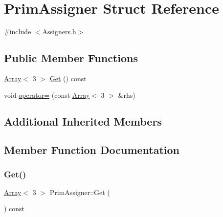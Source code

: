\hypertarget{structPrimAssigner}{}\section{Prim\+Assigner Struct Reference}
\label{structPrimAssigner}


{\ttfamily \#include $<$Assigners.\+h$>$}

\subsection*{Public Member Functions}
\begin{DoxyCompactItemize}
\item 
\hyperlink{Includes_8h_abd9de33944f934950000c3929e14ad8d}{Array}$<$ 3 $>$ \hyperlink{structPrimAssigner_ad883c9bec1fb17226f7f9c6c87146622}{Get} () const
\item 
void \hyperlink{structPrimAssigner_ab601615dec819d9e8756d77fb7d76ab3}{operator=} (const \hyperlink{Includes_8h_abd9de33944f934950000c3929e14ad8d}{Array}$<$ 3 $>$ \&rhs)
\end{DoxyCompactItemize}
\subsection*{Additional Inherited Members}


\subsection{Member Function Documentation}
\mbox{\label{structPrimAssigner_ad883c9bec1fb17226f7f9c6c87146622}} 
\subsubsection{\texorpdfstring{Get()}{Get()}}
{\footnotesize\ttfamily \hyperlink{Includes_8h_abd9de33944f934950000c3929e14ad8d}{Array}$<$ 3 $>$ Prim\+Assigner\+::\+Get (\begin{DoxyParamCaption}{ }\end{DoxyParamCaption}) const}

\mbox{\label{structPrimAssigner_ab601615dec819d9e8756d77fb7d76ab3}} 
